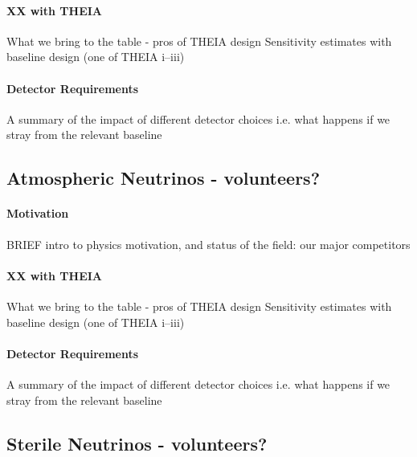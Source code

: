 \documentclass[11pt,prd,letterpaper,amsmath,amssymb,final,nofootinbib
,unsortedaddress,superscriptaddress
]{revtex4-1}
\begin{document}
\paragraph{XX with THEIA}
What we bring to the table - pros of THEIA design \newline
Sensitivity estimates with baseline design (one of THEIA i--iii)
\paragraph{Detector Requirements}
A summary of the impact of different detector choices i.e. what happens if we stray from the relevant baseline

\subsection{Atmospheric Neutrinos - \bf volunteers?}
\paragraph{Motivation}
BRIEF intro to physics motivation, and status of the field: our major competitors
\paragraph{XX with THEIA}
What we bring to the table - pros of THEIA design \newline
Sensitivity estimates with baseline design (one of THEIA i--iii)
\paragraph{Detector Requirements}
A summary of the impact of different detector choices i.e. what happens if we stray from the relevant baseline





\subsection{Sterile Neutrinos - \bf volunteers?}
\end{document}
